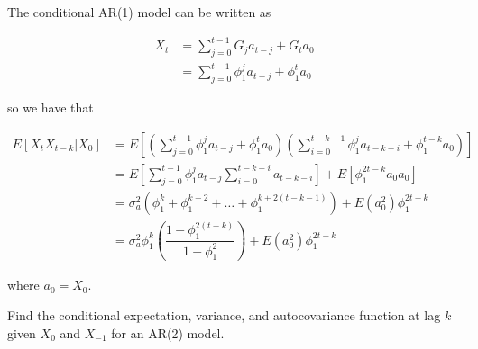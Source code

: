 \documentclass{article}
\numberwithin{questioncounter}{section}
\begin{document}
\begin{solution}
The conditional AR(1) model can be written as 

\begin{align*}
X_{t} &= \sum_{j=0}^{t-1} G_{j} a_{t-j} + G_{t} a_{0} \\
&= \sum_{j=0}^{t-1} \phi_{1}^{j} a_{t-j} + \phi_{1}^{t} a_{0}
\end{align*}

so we have that

\begin{align*}
E[X_{t} X_{t-k} | X_{0}] &= E\left[ \left(\sum_{j=0}^{t-1} \phi_{1}^{j} a_{t-j} + \phi_{1}^{t} a_{0}\right)\left(\sum_{i=0}^{t-k-1} \phi_{1}^{j} a_{t-k-i} + \phi_{1}^{t-k} a_{0}\right) \right] \\
&= E\left[ \sum_{j=0}^{t-1} \phi_{1}^{j} a_{t-j} \sum_{i=0}^{t-k-i} a_{t-k-i} \right] + E\left[ \phi_{1}^{2t-k} a_{0}a_{0}\right] \\
&= \sigma_{a}^{2} \left( \phi_{1}^{k} + \phi_{1}^{k+2} + \dots + \phi_{1}^{k + 2(t-k-1)}\right) + E(a_{0}^{2}) \phi_{1}^{2t-k} \\
&= \sigma_{a}^{2} \phi_{1}^{k} \left(\dfrac{1 - \phi_{1}^{2(t-k)}}{1 - \phi_{1}^{2}}\right) + E(a_{0}^{2}) \phi_{1}^{2t-k}
\end{align*}

where $a_{0} = X_{0}$.

\end{solution}

\begin{question}
Find the conditional expectation, variance, and autocovariance function at lag $k$ given $X_{0}$ and $X_{-1}$ for an AR(2) model.

\end{question}
\end{document}
